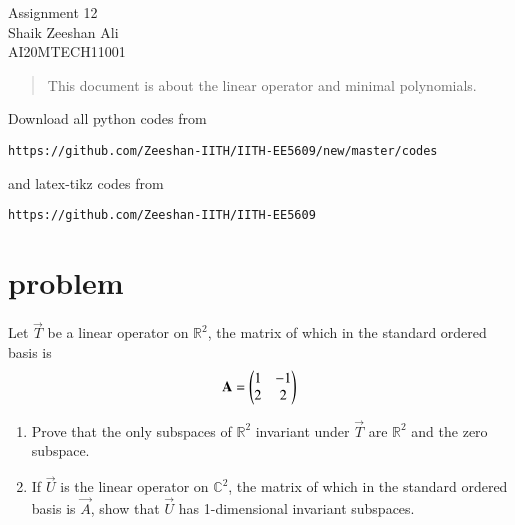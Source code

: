 \documentclass[journal,12pt]{IEEEtran}
\begin{document}
\renewcommand{\thefigure}{\theproblem}
\def\putbox#1#2#3{\makebox[0in][l]{\makebox[#1][l]{}\raisebox{\baselineskip}[0in][0in]{\raisebox{#2}[0in][0in]{#3}}}}
     \def\rightbox#1{\makebox[0in][r]{#1}}
     \def\centbox#1{\makebox[0in]{#1}}
     \def\topbox#1{\raisebox{-\baselineskip}[0in][0in]{#1}}
     \def\midbox#1{\raisebox{-0.5\baselineskip}[0in][0in]{#1}}
\vspace{3cm}
\begin{center}
\huge Assignment 12\\
\large Shaik Zeeshan Ali\\
\large AI20MTECH11001\\
\end{center}
\begin{abstract}
This document is about the linear operator and minimal polynomials.
\end{abstract}
Download all python codes from 
\begin{lstlisting}
https://github.com/Zeeshan-IITH/IITH-EE5609/new/master/codes
\end{lstlisting}
and latex-tikz codes from 
\begin{lstlisting}
https://github.com/Zeeshan-IITH/IITH-EE5609
\end{lstlisting}
\section{problem}
Let $\vec{T}$ be a linear operator on $\mathbb{R}^2$, the matrix of which in the standard ordered basis is
\begin{align}
    \mathbf{A}=\begin{pmatrix}1&-1\\2&2\end{pmatrix}
\end{align}
\begin{enumerate}
    \item Prove that the only subspaces of $\mathbb{R}^2$ invariant under $\vec{T}$ are $\mathbb{R}^2$ and the zero subspace.
    \item If $\vec{U}$ is the linear operator on $\mathbb{C}^2$, the matrix of which in the standard ordered basis is $\vec{A}$, show that $\vec{U}$ has 1-dimensional invariant subspaces.
\end{enumerate}
\end{document}
